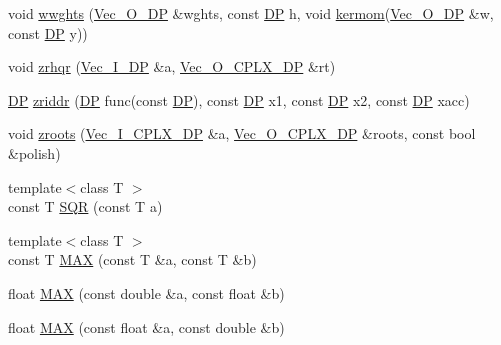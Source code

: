 \begin{DoxyCompactItemize}
\item 
void \mbox{\hyperlink{namespaceNR_a58e63db23848e90d1a5db7af79dda323}{wwghts}} (\mbox{\hyperlink{namespaceNR_a970094d23441f8ef6a45282a7eb2103d}{Vec\+\_\+\+O\+\_\+\+DP}} \&wghts, const \mbox{\hyperlink{namespaceNR_af6ff762dd605ff477b8e52387253a02a}{DP}} h, void \mbox{\hyperlink{namespaceNR_a0cbc2daad62a102dd3359715e4b1bc70}{kermom}}(\mbox{\hyperlink{namespaceNR_a970094d23441f8ef6a45282a7eb2103d}{Vec\+\_\+\+O\+\_\+\+DP}} \&w, const \mbox{\hyperlink{namespaceNR_af6ff762dd605ff477b8e52387253a02a}{DP}} y))
\item 
void \mbox{\hyperlink{namespaceNR_a07f1329337e99d2666332950c702b2c7}{zrhqr}} (\mbox{\hyperlink{namespaceNR_a9f943da53862537c552e2a770cb170ae}{Vec\+\_\+\+I\+\_\+\+DP}} \&a, \mbox{\hyperlink{namespaceNR_ace78d6fd6a189eda11ef1f1ec73692d9}{Vec\+\_\+\+O\+\_\+\+C\+P\+L\+X\+\_\+\+DP}} \&rt)
\item 
\mbox{\hyperlink{namespaceNR_af6ff762dd605ff477b8e52387253a02a}{DP}} \mbox{\hyperlink{namespaceNR_a13232764cfbf0d7a5acabe727c7109bd}{zriddr}} (\mbox{\hyperlink{namespaceNR_af6ff762dd605ff477b8e52387253a02a}{DP}} func(const \mbox{\hyperlink{namespaceNR_af6ff762dd605ff477b8e52387253a02a}{DP}}), const \mbox{\hyperlink{namespaceNR_af6ff762dd605ff477b8e52387253a02a}{DP}} x1, const \mbox{\hyperlink{namespaceNR_af6ff762dd605ff477b8e52387253a02a}{DP}} x2, const \mbox{\hyperlink{namespaceNR_af6ff762dd605ff477b8e52387253a02a}{DP}} xacc)
\item 
void \mbox{\hyperlink{namespaceNR_a7c019f6e455600b25e89123914373a23}{zroots}} (\mbox{\hyperlink{namespaceNR_ad1b14bf0517c78cb2e0c1407b08ba92b}{Vec\+\_\+\+I\+\_\+\+C\+P\+L\+X\+\_\+\+DP}} \&a, \mbox{\hyperlink{namespaceNR_ace78d6fd6a189eda11ef1f1ec73692d9}{Vec\+\_\+\+O\+\_\+\+C\+P\+L\+X\+\_\+\+DP}} \&roots, const bool \&polish)
\item 
{\footnotesize template$<$class T $>$ }\\const T \mbox{\hyperlink{namespaceNR_a992bfd1c07cbd8f9fe94e42c055fd656}{S\+QR}} (const T a)
\item 
{\footnotesize template$<$class T $>$ }\\const T \mbox{\hyperlink{namespaceNR_a92c68d40de4a9647ae9f24ec57c53b0e}{M\+AX}} (const T \&a, const T \&b)
\item 
float \mbox{\hyperlink{namespaceNR_a1ccd7f766f5de91f30115cf7298019fa}{M\+AX}} (const double \&a, const float \&b)
\item 
float \mbox{\hyperlink{namespaceNR_a77558a6eb41778af357e2b2fbc811eeb}{M\+AX}} (const float \&a, const double \&b)

\end{DoxyCompactItemize}
